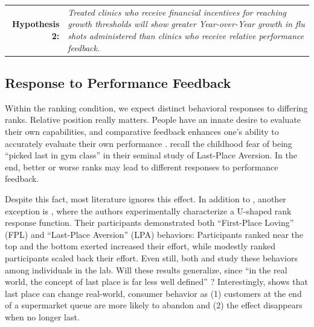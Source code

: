  \medskip \noindent
 \begin{tabularx} {\linewidth}{ r X }
    \textbf{Hypothesis 2:} & \textit{Treated clinics who receive financial incentives for reaching growth thresholds will show greater Year-over-Year growth in flu shots administered than clinics who receive relative performance feedback.} \\
 \end{tabularx}   %
 
 \subsection{Response to Performance Feedback}
 Within the ranking condition, we expect distinct behavioral responses to differing ranks. Relative position really matters. People have an innate desire to evaluate their own capabilities, and comparative feedback enhances one’s ability to accurately evaluate their own performance \citep{Festinger1954}. \cite{Kuziemko2014} recall the childhood fear of being “picked last in gym class” in their seminal study of Last-Place Aversion. In the end, better or worse ranks may lead to different responses to performance feedback.
 
 Despite this fact, most literature ignores this effect. In addition to \cite{Kuziemko2014}, another exception is \cite{Gill2019}, where the authors experimentally characterize a U-shaped rank response function. Their participants demonstrated both “First-Place Loving” (FPL) and “Last-Place Aversion” (LPA) behaviors: Participants ranked near the top and the bottom exerted increased their effort, while modestly ranked participants scaled back their effort. Even still, both \cite{Kuziemko2014} and \cite{Gill2019} study these behaviors among individuals in the lab. Will these results generalize, since “in the real world, the concept of last place is far less well defined” \citep[][p. 107]{Kuziemko2014}? Interestingly, \cite{Buell2021} shows that last place can change real-world, consumer behavior as (1) customers at the end of a supermarket queue are more likely to abandon and (2) the effect disappears when no longer last. 
 
